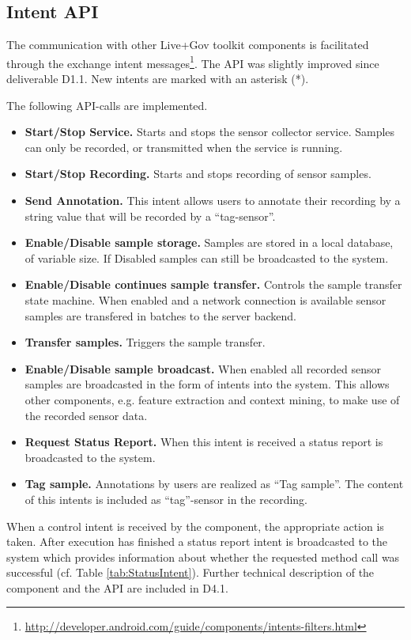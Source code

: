 \subsection{Intent API}
\label{subsubsec:IntentAPIdescription}

The communication with other Live+Gov toolkit components is
facilitated through the exchange intent
messages\footnote{\url{http://developer.android.com/guide/components/intents-filters.html}}. 
The API was slightly improved since deliverable D1.1. New intents are
marked with an asterisk (*).

The following API-calls are implemented.
\begin{itemize}
\item {\bfseries Start/Stop Service.} Starts and stops the sensor
  collector service. Samples can only be recorded, or transmitted when
  the service is running.
\item {\bfseries Start/Stop Recording.} Starts and stops recording of
  sensor samples.
\item {\bf Send Annotation.} This intent allows users to annotate
  their recording by a string value that will be recorded by a
  ``tag-sensor''.
\item {\bfseries Enable/Disable sample storage.} Samples are stored in
  a local database, of variable size. If Disabled samples can still be
  broadcasted to the system.
\item {\bfseries Enable/Disable continues sample transfer.} Controls
  the sample transfer state machine. When enabled and a network
  connection is available sensor samples are transfered in batches to
  the server backend.
\item {\bfseries Transfer samples.} Triggers the sample transfer.
\item {\bfseries Enable/Disable sample broadcast.} When enabled all
  recorded sensor samples are broadcasted in the form of intents into
  the system. This allows other components, e.g. feature extraction
  and context mining, to make use of the recorded sensor data.
\item {\bfseries Request Status Report.} When this intent is received
  a status report is broadcasted to the system.
\item {\bfseries Tag sample.}  Annotations by users are realized as
  ``Tag sample''.  The content of this intents is included as
  ``tag''-sensor in the recording.
\end{itemize}

When a control intent is received by the component, the appropriate
action is taken. After execution has finished a status report intent
is broadcasted to the system which provides information about whether
the requested method call was successful (cf. Table
\ref{tab:StatusIntent}).  Further technical description of the
component and the API are included in D4.1.


